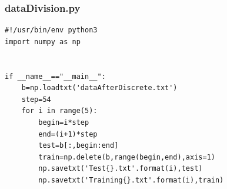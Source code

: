 \documentclass{ctexart}
\begin{document}
\subsubsection*{dataDivision.py}
\begin{scriptsize}
\begin{verbatim}
#!/usr/bin/env python3
import numpy as np


if __name__=="__main__":
    b=np.loadtxt('dataAfterDiscrete.txt')
    step=54
    for i in range(5):
        begin=i*step
        end=(i+1)*step
        test=b[:,begin:end]
        train=np.delete(b,range(begin,end),axis=1)
        np.savetxt('Test{}.txt'.format(i),test)
        np.savetxt('Training{}.txt'.format(i),train)
\end{verbatim}
\end{scriptsize}
\end{document}
